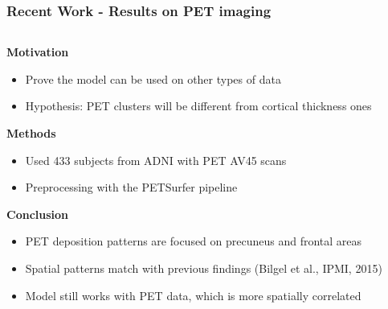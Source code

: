 \documentclass[8pt,xcolor=table]{beamer}
\begin{document}



\begin{frame}
\frametitle{Recent Work - Results on PET imaging}

\newcommand{\scalingFactor}{1}

\newcommand{\gradLimLeft}{-1.6}
\newcommand{\gradLimRight}{1.6}

\newcommand{\scalingFactorBrains}{1.0}
\newcommand{\scalingFactorTraj}{1}

\newcommand{\recentFigFold}{figures/}

\begin{columns}[T]
    \begin{column}{.55\textwidth}
    
    \vspace{3em}
    \textbf{Motivation}
    \begin{itemize}
      \item Prove the model can be used on other types of data
      \item Hypothesis: PET clusters will be different from cortical thickness ones
    \end{itemize}
    
    
    \textbf{Methods}
    \begin{itemize}
      \item Used 433 subjects from ADNI with PET AV45 scans
      \item Preprocessing with the PETSurfer pipeline
    \end{itemize}
    
    
    \textbf{Conclusion}
    \begin{itemize}
      \item PET deposition patterns are focused on precuneus and frontal areas
     \item Spatial patterns match with previous findings (Bilgel et al., IPMI, 2015)
     \item Model still works with PET data, which is more spatially correlated
    \end{itemize}
     
    \end{column}
    

\end{columns}
\end{frame}
\end{document}
